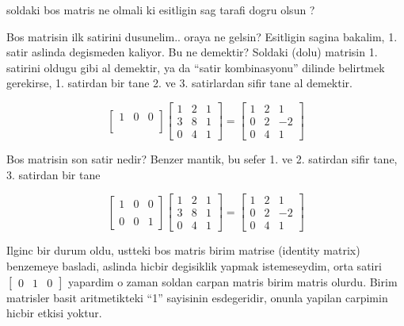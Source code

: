 \documentclass[12pt,fleqn]{article}\usepackage{../common}
\begin{document}
soldaki bos matris ne olmali ki esitligin sag tarafi dogru olsun ?

Bos matrisin ilk satirini dusunelim.. oraya ne gelsin? Esitligin sagina
bakalim, 1. satir aslinda degismeden kaliyor. Bu ne demektir? Soldaki
(dolu) matrisin 1. satirini oldugu gibi al demektir, ya da ``satir
kombinasyonu'' dilinde belirtmek gerekirse, 1. satirdan bir tane 2. ve
3. satirlardan sifir tane al demektir. 

$$ 
\left[\begin{array}{rrr}
1 & 0 & 0 \\
 &  &  \\
 &  & 
\end{array}\right]
\left[\begin{array}{rrr}
1 & 2 & 1 \\
3 & 8 & 1 \\
0 & 4 & 1
\end{array}\right] =
\left[\begin{array}{rrr}
    1 & 2 & 1 \\
    0 & 2 & -2 \\
    0 & 4 & 1
  \end{array}\right]
 $$

Bos matrisin son satir nedir? Benzer mantik, bu sefer 1. ve 2. satirdan
sifir tane, 3. satirdan bir tane


$$ 
\left[\begin{array}{rrr}
1 & 0 & 0 \\
 &  &  \\
0 & 0 & 1
\end{array}\right]
\left[\begin{array}{rrr}
1 & 2 & 1 \\
3 & 8 & 1 \\
0 & 4 & 1
\end{array}\right] =
\left[\begin{array}{rrr}
    1 & 2 & 1 \\
    0 & 2 & -2 \\
    0 & 4 & 1
  \end{array}\right]
 $$

Ilginc bir durum oldu, ustteki bos matris birim matrise (identity matrix)
benzemeye basladi, aslinda hicbir degisiklik yapmak istemeseydim, orta
satiri $\left[\begin{array}{rrr}0 & 1 & 0 \end{array}\right]$ yapardim o zaman soldan carpan matris birim matris
olurdu. Birim matrisler basit aritmetikteki ``1'' sayisinin esdegeridir,
onunla yapilan carpimin hicbir etkisi yoktur.
\end{document}
